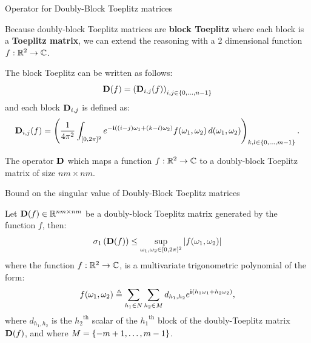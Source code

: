 \begin{frame}{Operator for Doubly-Block Toeplitz matrices}

  Because doubly-block Toeplitz matrices are \textbf{block Toeplitz} where each block is a \textbf{Toeplitz matrix}, we can extend the reasoning with a 2 dimensional function  $f: {\mathbb{R}}^2 \rightarrow {\ensuremath \mathbb{C}}$.
  
  The block Toeplitz can be written as follows:
  \begin{equation*}
    \mathbf{D}(f) =\left(\mathbf{D}_{i,j}(f)\right)_{i,j\in\{0,\ldots ,n-1\}}
  \end{equation*}
  and each block $\mathbf{D}_{i,j}$ is defined as:
  \begin{equation*}
    \mathbf{D}_{i,j}(f) =\left(\frac{1}{4\pi^{2}}\int_{[0,2\pi]^{2}}e^{-\mathbf{i}\left((i-j)\omega_{1}+(k-l)\omega_{2}\right)}f(\omega_{1},\omega_{2})\,d(\omega_{1},\omega_{2})\right)_{k,l\in\{0,\ldots,m-1\}} .
  \end{equation*}

  The operator $\mathbf{D}$ which maps a function $f: {\mathbb{R}}^2 \rightarrow {\ensuremath \mathbb{C}}$ to a doubly-block Toeplitz matrix of size $nm \times nm$.

\end{frame}


\begin{frame}{Bound on the singular value of Doubly-Block Toeplitz matrices}

  \begin{theorem}
    Let $\mathbf{D} (f) \in {\ensuremath \mathbb{R}}^{nm \times nm}$ be a doubly-block Toeplitz matrix generated by the function $f$, then:
    \begin{equation*}
      \sigma_1 \left( \mathbf{D}(f) \right) \leq \sup_{\omega_1, \omega_2 \in [0, 2\pi]^2} |f(\omega_1,\omega_2)|
    \end{equation*}
    where the function $f: {\mathbb{R}}^2 \rightarrow {\ensuremath \mathbb{C}}$, is a multivariate trigonometric polynomial of the form:
    \begin{equation*}
      f(\omega_1, \omega_2) \triangleq \sum_{h_1 \in N} \sum_{h_2 \in M} d_{h_1, h_2} e^{\mathbf{i} (h_1 \omega_1 + h_2 \omega_2)},
    \end{equation*}
    where $d_{h_1, h_2}$ is the ${h_2}^\mathrm{th}$ scalar of the ${h_1}^\mathrm{th}$ block of the doubly-Toeplitz matrix $\mathbf{D}(f)$, and where $M = \{-m+1,\dots, m-1 \}$.
  \end{theorem}

\end{frame}


